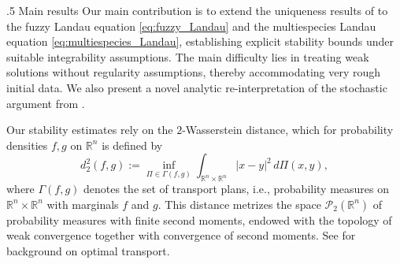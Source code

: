 \documentclass[10pt,oneside]{amsart}
\makeatletter
\def\subsection{\@startsection{subsection}{2}%
  \z@{.5\linespacing\@plus.7\linespacing}
{.5\baselineskip}%
  {\normalfont\centering\scshape}%
}
\numberwithin{equation}{section}
\numberwithin{definition}{section}
\numberwithin{theorem}{section}
\numberwithin{lemma}{section}
\makeatother
\begin{document}
\subsection{Main results}
Our main contribution is to extend the uniqueness results of \cite{fournier2009well_posedness_soft_potentials,fournier2010uniqueness_Coulomb} to the fuzzy Landau equation \cref{eq:fuzzy_Landau} and the multiespecies Landau equation \cref{eq:multiespecies_Landau}, establishing explicit stability bounds under suitable integrability assumptions. The main difficulty lies in treating weak solutions without regularity assumptions, thereby accommodating very rough initial data. We also present a novel analytic re-interpretation of the stochastic argument from \cite{fournier2009well_posedness_soft_potentials,fournier2010uniqueness_Coulomb}.

Our stability estimates rely on the $2$-Wasserstein distance, which for probability densities $f,g$ on $\mathbb R^n$ is defined by
%
\begin{equation*}
d_2^2(f,g) := \inf_{\Pi\in\Gamma(f,g)} \int_{\mathbb R^n\times\mathbb R^n} |x-y|^2\,d\Pi(x,y),
\end{equation*}
%
where $\Gamma(f,g)$ denotes the set of transport plans, i.e., probability measures on $\mathbb{R}^n\times\mathbb{R}^n$ with marginals $f$ and $g$. This distance metrizes the space $\mathcal P_2(\mathbb R^n)$ of probability measures with finite second moments, endowed with the topology of weak convergence together with convergence of second moments. See \cite{villani2003topicsOT} for background on optimal transport.
\end{document}
